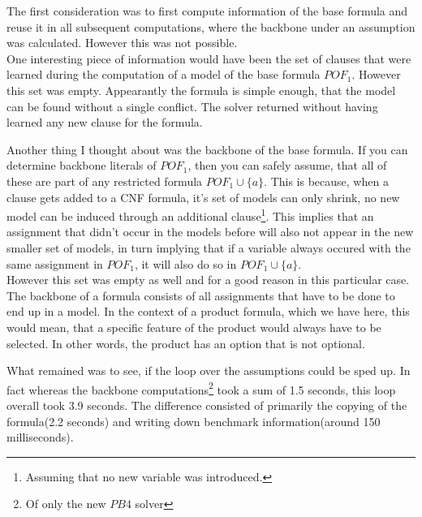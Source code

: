 The first consideration was to first compute information of the base formula and reuse it in all subsequent computations, where the backbone under an assumption was calculated. However this was not possible.\\
One interesting piece of information would have been the set of clauses that were learned during the computation of a model of the base formula $POF_1$. However this set was empty. Appearantly the formula is simple enough, that the model can be found without a single conflict. The solver returned without having learned any new clause for the formula.

Another thing I thought about was the backbone of the base formula. If you can determine backbone literals of $POF_1$, then you can safely assume, that all of these are part of any restricted formula $POF_1 \cup \{a\}$. This is because, when a clause gets added to a CNF formula, it's set of models can only shrink, no new model can be induced through an additional clause\footnote{Assuming that no new variable was introduced.}. This implies that an assignment that didn't occur in the models before will also not appear in the new smaller set of models, in turn implying that if a variable always occured with the same assignment in $POF_1$, it will also do so in $POF_1 \cup \{a\}$. \\
However this set was empty as well and for a good reason in this particular case. The backbone of a formula consists of all assignments that have to be done to end up in a model. In the context of a product formula, which we have here, this would mean, that a specific feature of the product would always have to be selected. In other words, the product has an option that is not optional. 

What remained was to see, if the loop over the assumptions could be sped up. In fact whereas the backbone computations\footnote{Of only the new $PB4$ solver} took a sum of 1.5 seconds, this loop overall took 3.9 seconds. The difference consisted of primarily the copying of the formula(2.2 seconds) and writing down benchmark information(around 150 milliseconds). 

